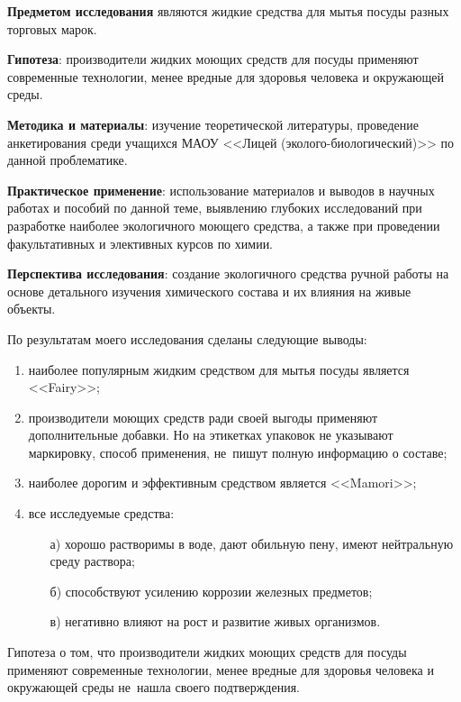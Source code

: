 \textbf{Предметом исследования} являются жидкие средства для мытья посуды разных торговых марок.

\textbf{Гипотеза}: производители жидких моющих средств для посуды применяют современные технологии, менее вредные для здоровья человека и окружающей среды.

\textbf{Методика и материалы}: изучение теоретической литературы, проведение анкетирования среди учащихся МАОУ <<Лицей (эколого-биологический)>> по данной проблематике.

\textbf{Практическое применение}: использование материалов и выводов в  научных работах и пособий по данной теме, выявлению глубоких исследований при разработке наиболее экологичного моющего средства, а также при проведении факультативных и элективных курсов по химии.

\textbf{Перспектива исследования}: создание экологичного средства ручной работы на основе детального изучения химического состава и их влияния на живые объекты.

По результатам моего исследования сделаны следующие выводы:
\begin{enumerate}[noitemsep]\vspace{-8pt}
\item наиболее популярным жидким средством для мытья посуды является <<Fairy>>;
\item производители моющих средств ради своей выгоды применяют дополнительные добавки. Но на этикетках упаковок не указывают маркировку, способ применения, не~пишут полную информацию о составе;
\item наиболее дорогим и эффективным средством является <<Mamori>>;\\
\item все исследуемые средства:
\begin{itemize}[noitemsep]
  \item[а)] хорошо растворимы в воде, дают обильную пену, имеют нейтральную среду раствора;
  \item[б)] способствуют усилению коррозии железных предметов;
  \item[в)] негативно влияют на рост и развитие живых организмов.
\end{itemize}
\end{enumerate}\vspace{-8pt}

Гипотеза о том, что производители жидких моющих средств для посуды применяют современные технологии, менее вредные для здоровья человека и окружающей среды не~нашла своего подтверждения.

